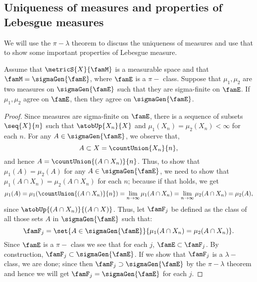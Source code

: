 \subsection{Uniqueness of measures and properties of Lebesgue measures}
We will use the $\pi-\lambda$ theorem to discuss the uniqueness of measures and use that to show some
important properties of Lebesgue measure.
\begin{Theorem}\label{thm:uniq_measures_pilam}
    Assume that $\metricS{X}{\famM}$ is a measurable space and that $\famM = \sigmaGen{\famE}$, where $\famE$
    is a $\pi-$ class. Suppose that $\mu_{1},\mu_{2}$ are two measures on $\sigmaGen{\famE}$ such that they
    are sigma-finite on $\famE$. If $\mu_{1},\mu_{2}$ agree on $\famE$, then they agree on $\sigmaGen{\famE}$.
\end{Theorem}
\begin{proof}
    Since measures are sigma-finite on $\famE$, there is a sequence of subsets $\seq{X}{n}$ such that
    $\atobUp{X_n}{X}$ and $\mu_{1}(X_n) = \mu_{2}(X_n) < \infty$ for each $n$. For any $A \in
    \sigmaGen{\famE}$, we observe that,
    \[A \subset X = \countUnion{X_n}{n},\]
    and hence $A= \countUnion{(A\cap X_n)}{n}$. Thus, to show that $\mu_{1}(A) = \mu_{2}(A)$ for any $A \in
    \sigmaGen{\famE}$, we need to show that $\mu_{1}(A\cap X_n) = \mu_{2}(A\cap X_n)$ for each $n$; because if
    that holds, we get
    \[\mu_{1}(A) = \mu_{1}(\countUnion{(A\cap X_n)}{n}) = \lim\limits_{n\to\infty} \mu_1(A\cap X_n) =
	\lim\limits_{n\to\infty} \mu_2(A\cap X_n) = \mu_2(A),\]
    since $\atobUp{(A\cap X_n)}{(A\cap X)}$. 
    Thus, let $\famF_{j}$ be defined as the class of all those sets $A$ in $\sigmaGen{\famE}$ such that:
    \[\famF_{j} = \set{A\in\sigmaGen{\famE}}{\mu_1(A\cap X_n) = \mu_2(A\cap X_n)}.\]
    Since $\famE$ is a $\pi-$ class we see that for each $j$, $\famE \subset \famF_{j}$. By construction,
    $\famF_{j} \subset \sigmaGen{\famE}$. If we show that $\famF_{j}$ is a $\lambda-$ class, we are done;
    since then $\famF_{j} \supset \sigmaGen{\famE}$ by the $\pi-\lambda$ theorem and hence we will get
    $\famF_{j} = \sigmaGen{\famE}$ for each $j$.


\end{proof}
